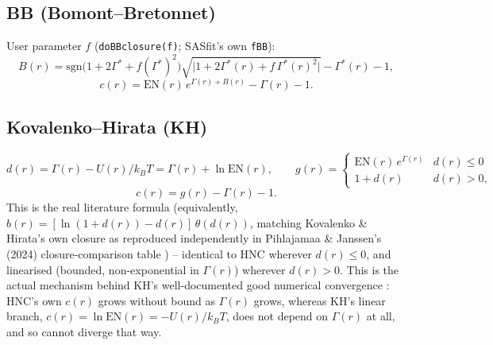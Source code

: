 \documentclass[11pt,a4paper]{article}
\newcommand{\code}[1]{\texttt{#1}}
\begin{document}
\subsection{BB (Bomont--Bretonnet) \cite{bomontbretonnet2001}}
User parameter $f$ (\code{doBBclosure(f)}; SASfit's own \code{fBB}):
\begin{equation}
  B(r) = \mathrm{sgn}\!\big(1{+}2\Gamma^*{+}f(\Gamma^*)^2\big)\sqrt{\big|1+2\Gamma^*(r)+f\,\Gamma^*(r)^2\big|} - \Gamma^*(r) - 1,
\end{equation}
\begin{equation}
  c(r) = \mathrm{EN}(r)\,e^{\Gamma(r)+B(r)} - \Gamma(r) - 1.
\end{equation}

\subsection{Kovalenko--Hirata (KH) \cite{kovalenkohirata1998}}
\label{sec:kh}
\begin{equation}
  d(r) = \Gamma(r) - U(r)/k_BT = \Gamma(r) + \ln\mathrm{EN}(r), \qquad
  g(r) = \begin{cases} \mathrm{EN}(r)\,e^{\Gamma(r)} & d(r)\le0\\ 1+d(r) & d(r)>0, \end{cases}
\end{equation}
\begin{equation}
  c(r) = g(r) - \Gamma(r) - 1.
\end{equation}
This is the real literature formula (equivalently,
$b(r)=[\ln(1+d(r))-d(r)]\,\theta(d(r))$, matching Kovalenko \& Hirata's own
closure \cite{kovalenkohirata1998} as reproduced independently in
Pihlajamaa \& Janssen's (2024) closure-comparison table
\cite{PihlajamaaJanssen2024}) -- identical to HNC wherever $d(r)\le0$, and linearised
(bounded, non-exponential in $\Gamma(r)$) wherever $d(r)>0$. This is the
actual mechanism behind KH's well-documented good numerical convergence
\cite{ebato2016}: HNC's own $c(r)$ grows without bound as $\Gamma(r)$
grows, whereas KH's linear branch, $c(r)=\ln\mathrm{EN}(r)=-U(r)/k_BT$,
does not depend on $\Gamma(r)$ at all, and so cannot diverge that way.
\end{document}
